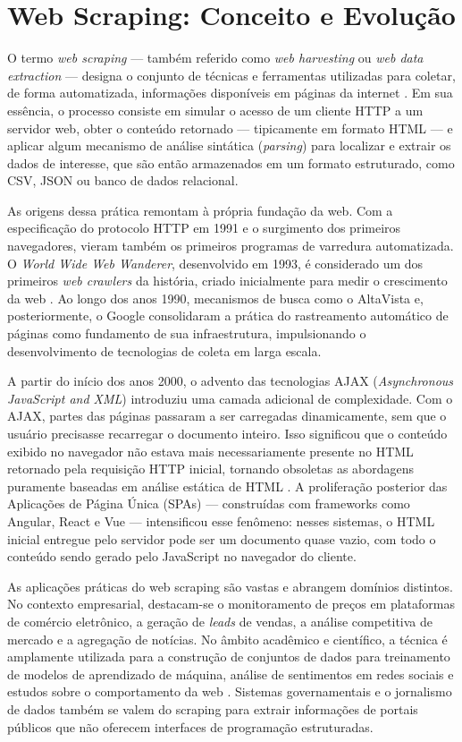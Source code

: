 \documentclass[tcc,capa]{texifsul}
\begin{document}
\section{Web Scraping: Conceito e Evolução}

O termo \textit{web scraping} — também referido como \textit{web harvesting} ou \textit{web data extraction} — designa o conjunto de técnicas e ferramentas utilizadas para coletar, de forma automatizada, informações disponíveis em páginas da internet \cite{Mitchell2018}. Em sua essência, o processo consiste em simular o acesso de um cliente HTTP a um servidor web, obter o conteúdo retornado — tipicamente em formato HTML — e aplicar algum mecanismo de análise sintática (\textit{parsing}) para localizar e extrair os dados de interesse, que são então armazenados em um formato estruturado, como CSV, JSON ou banco de dados relacional.

As origens dessa prática remontam à própria fundação da web. Com a especificação do protocolo HTTP em 1991 e o surgimento dos primeiros navegadores, vieram também os primeiros programas de varredura automatizada. O \textit{World Wide Web Wanderer}, desenvolvido em 1993, é considerado um dos primeiros \textit{web crawlers} da história, criado inicialmente para medir o crescimento da web \cite{Mitchell2018}. Ao longo dos anos 1990, mecanismos de busca como o AltaVista e, posteriormente, o Google consolidaram a prática do rastreamento automático de páginas como fundamento de sua infraestrutura, impulsionando o desenvolvimento de tecnologias de coleta em larga escala.

A partir do início dos anos 2000, o advento das tecnologias AJAX (\textit{Asynchronous JavaScript and XML}) introduziu uma camada adicional de complexidade. Com o AJAX, partes das páginas passaram a ser carregadas dinamicamente, sem que o usuário precisasse recarregar o documento inteiro. Isso significou que o conteúdo exibido no navegador não estava mais necessariamente presente no HTML retornado pela requisição HTTP inicial, tornando obsoletas as abordagens puramente baseadas em análise estática de HTML \cite{GlezPena2014}. A proliferação posterior das Aplicações de Página Única (SPAs) — construídas com frameworks como Angular, React e Vue — intensificou esse fenômeno: nesses sistemas, o HTML inicial entregue pelo servidor pode ser um documento quase vazio, com todo o conteúdo sendo gerado pelo JavaScript no navegador do cliente.

As aplicações práticas do web scraping são vastas e abrangem domínios distintos. No contexto empresarial, destacam-se o monitoramento de preços em plataformas de comércio eletrônico, a geração de \textit{leads} de vendas, a análise competitiva de mercado e a agregação de notícias. No âmbito acadêmico e científico, a técnica é amplamente utilizada para a construção de conjuntos de dados para treinamento de modelos de aprendizado de máquina, análise de sentimentos em redes sociais e estudos sobre o comportamento da web \cite{Mitchell2018}. Sistemas governamentais e o jornalismo de dados também se valem do scraping para extrair informações de portais públicos que não oferecem interfaces de programação estruturadas.
\end{document}
